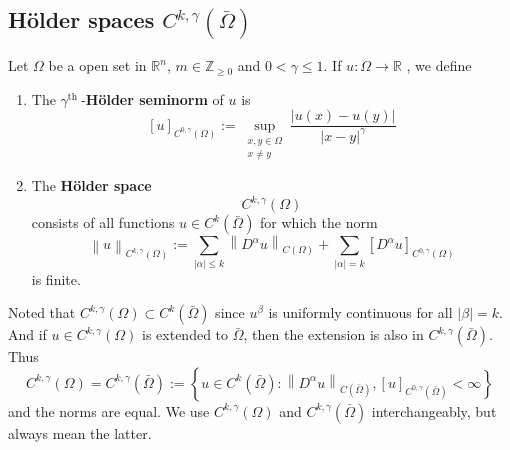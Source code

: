 \subsection{Hölder spaces $C^{k,\gamma}\left(\bar{\Omega}\right)$} %
\begin{definition}
    Let $\Omega$ be a open set in $\mathbb{R}^n$, $m\in \mathbb{Z}_{\geq 0}$ and $0<\gamma\leq 1$.
    If $u : \Omega \to \mathbb{R}$ , we define
    \begin{enumerate}
        \item
              The $\gamma^{\text {th }}$-\textbf{Hölder seminorm} of $u$ is
              \begin{equation*}
                  \left[u\right]_{C^{0, \gamma}\left({\Omega}\right)}
                  :=
                  \sup_{\substack{x, y \in \Omega \\ x \neq y}}
                  \frac{\left|u(x)-u(y)\right|}{\left|x-y\right|^\gamma}
              \end{equation*}
        \item
              The \textbf{Hölder space}
              \begin{equation*}
                  C^{k, \gamma}\left(\Omega\right)
              \end{equation*}
              consists of all functions $u \in C^k(\bar{\Omega})$ for which the norm
              \begin{equation*}
                  \left\|u\right\|_{C^{k, \gamma}(\Omega)}
                  :=
                  \sum_{\left|\alpha\right| \leq k}\left\|D^\alpha u\right\|_{C(\Omega)}+\sum_{\left|\alpha\right|=k}\left[D^\alpha u\right]_{C^{0, \gamma}(\Omega)}
              \end{equation*}
              is finite.
    \end{enumerate}
    \begin{remark}
        Noted that $C^{k,\gamma}\left(\Omega\right) \subset C^k\left(\bar{\Omega}\right)$ since $u^\beta$ is uniformly continuous for all $\left|\beta\right|=k$.
        And if $u\in C^{k,\gamma}\left(\Omega\right)$ is extended to $\bar{\Omega}$, then the extension is also in $C^{k,\gamma}\left(\bar{\Omega}\right)$. Thus
        \begin{equation*}
            C^{k,\gamma}\left(\Omega\right)
            =
            C^{k,\gamma}\left(\bar{\Omega}\right)
            :=
            \left\{u\in C^k\left(\bar{\Omega}\right) : \left\|D^\alpha u\right\|_{C(\bar{\Omega})}, \left[u\right]_{C^{0, \gamma}\left({\bar{\Omega}}\right)} < \infty \right\}
        \end{equation*}
        and the norms are equal.
        We use $C^{k,\gamma}\left(\Omega\right)$ and $C^{k,\gamma}\left(\bar{\Omega}\right)$ interchangeably, but always mean the latter.
    \end{remark}
\end{definition}


